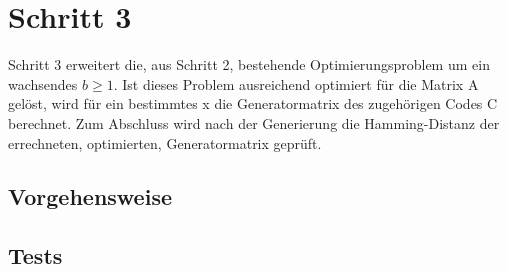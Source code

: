 \section{Schritt 3}
Schritt 3 erweitert die, aus Schritt 2, bestehende Optimierungsproblem  um ein wachsendes $b \geq 1$. Ist dieses Problem ausreichend optimiert für die Matrix A gelöst, wird für ein bestimmtes x die Generatormatrix des zugehörigen Codes C berechnet.  Zum Abschluss wird nach der Generierung die Hamming-Distanz der errechneten, optimierten, Generatormatrix geprüft.

\subsection{Vorgehensweise}

\subsection{Tests}